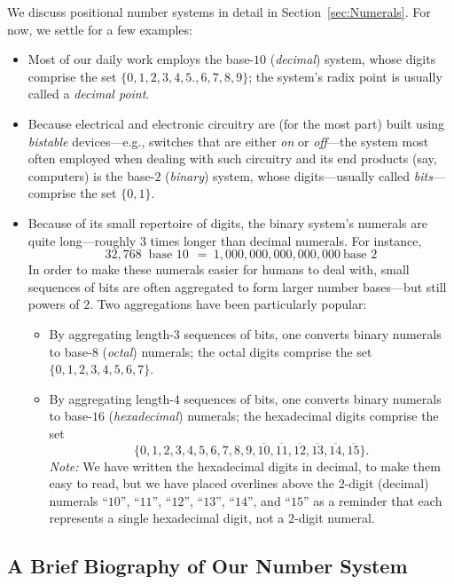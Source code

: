 \noindent
We discuss positional number systems in detail in
Section~\ref{sec:Numerals}.  For now, we settle for a few examples:
\begin{itemize}
\item
Most of our daily work employs the base-$10$ ({\it decimal}) system,
whose digits comprise the set $\{0, 1, 2, 3, 4, 5., 6, 7, 8, 9\}$; the
system's radix point is usually called a {\em decimal point}.

\item
Because electrical and electronic circuitry are (for the most part)
built using {\it bistable} devices---e.g., switches that are either
{\em on} or {\em off}---the system most often employed when dealing
with such circuitry and its end products (say, computers) is the
base-$2$ ({\it binary}) system, whose digits---usually called {\it
  bits}---comprise the set $\{0, 1\}$.

\item
Because of its small repertoire of digits, the binary system's
numerals are quite long---roughly $3$ times longer than decimal
numerals.  For instance,
\[ 32,768 \ \mbox{ base $10$} \ \ = \ 1,000,000,000,000,000 \ \mbox{
  base $2$}
\]
In order to make these numerals easier for humans to deal with, small
sequences of bits are often aggregated to form larger number bases---but
still powers of $2$.  Two aggregations have been particularly popular:
  \begin{itemize}
  \item
By aggregating length-$3$ sequences of bits, one converts binary
numerals to base-$8$ ({\it octal}) numerals; the octal digits comprise
the set $\{0, 1, 2, 3, 4, 5, 6, 7\}$.
  \item
By aggregating length-$4$ sequences of bits, one converts binary
numerals to base-$16$ ({\it hexadecimal}) numerals; the hexadecimal
digits comprise the set
\[ \{0, 1, 2, 3, 4, 5, 6, 7, 8, 9, \overline{10}, \overline{11},
\overline{12}, \overline{13}, \overline{14}, \overline{15}\}.
\]
{\it Note:} We have written the hexadecimal digits in decimal, to make
them easy to read, but we have placed overlines above the $2$-digit
(decimal) numerals ``$10$'', ``$11$'', ``$12$'', ``$13$'', ``$14$'',
and ``$15$'' as a reminder that each represents a single hexadecimal
digit, not a $2$-digit numeral.
  \end{itemize}
\end{itemize}


\subsection{A Brief Biography of Our Number System}
\label{sec:number-taxonomy}


